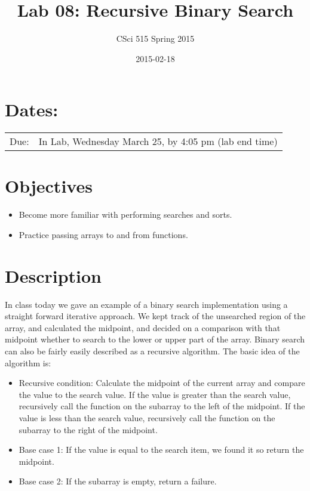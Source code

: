\documentclass[11pt]{article}
\title{Lab 08: Recursive Binary Search}
\author{CSci 515 Spring 2015}
\date{2015-02-18}
\begin{document}
\maketitle


\section*{Dates:}
\label{sec-1}


\begin{center}
\begin{tabular}{ll}
 Due:  &  In Lab, Wednesday March 25, by 4:05 pm (lab end time)  \\
\end{tabular}
\end{center}
\section*{Objectives}
\label{sec-2}

\begin{itemize}
\item Become more familiar with performing searches and sorts.
\item Practice passing arrays to and from functions.
\end{itemize}
\section*{Description}
\label{sec-3}

In class today we gave an example of a binary search implementation
using a straight forward iterative approach.  We kept track of the
unsearched region of the array, and calculated the midpoint, and
decided on a comparison with that midpoint whether to search to the
lower or upper part of the array.  Binary search can also be fairly
easily described as a recursive algorithm.  The basic idea of the
algorithm is:

\begin{itemize}
\item Recursive condition: Calculate the midpoint of the current array and
  compare the value to the search value.  If the value is greater than
  the search value, recursively call the function on the subarray to
  the left of the midpoint.  If the value is less than the search
  value, recursively call the function on the subarray to the right of
  the midpoint.
\item Base case 1: If the value is equal to the search item, we found it
  so return the midpoint.
\item Base case 2: If the subarray is empty, return a failure.
\end{itemize}
\end{document}
